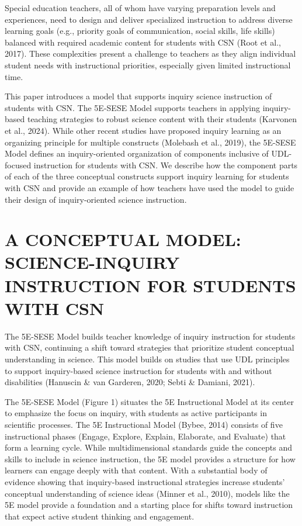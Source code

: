 \documentclass[11.5pt]{sig-alternate} %
\begin{document}
\begin{large}
Special education teachers, all of whom have varying preparation levels and experiences, need to design and deliver specialized instruction to address diverse learning goals (e.g., priority goals of communication, social skills, life skills) balanced with required academic content for students with CSN (Root et al., 2017). These complexities present a challenge to teachers as they align individual student needs with instructional priorities, especially given limited instructional time.

This paper introduces a model that supports inquiry science instruction of students with CSN. The 5E-SESE Model supports teachers in applying inquiry-based teaching strategies to robust science content with their students (Karvonen et al., 2024). While other recent studies have proposed inquiry learning as an organizing principle for multiple constructs (Molebash et al., 2019), the 5E-SESE Model defines an inquiry-oriented organization of components inclusive of UDL-focused instruction for students with CSN. We describe how the component parts of each of the three conceptual constructs support inquiry learning for students with CSN and provide an example of how teachers have used the model to guide their design of inquiry-oriented science instruction.

\section*{A CONCEPTUAL MODEL: SCIENCE-INQUIRY INSTRUCTION FOR STUDENTS WITH CSN}

The 5E-SESE Model builds teacher knowledge of inquiry instruction for students with CSN, continuing a shift toward strategies that prioritize student conceptual understanding in science. This model builds on studies that use UDL principles to support inquiry-based science instruction for students with and without disabilities (Hanuscin \& van Garderen, 2020; Sebti \& Damiani, 2021).

The 5E-SESE Model (Figure 1) situates the 5E Instructional Model at its center to emphasize the focus on inquiry, with students as active participants in scientific processes. The 5E Instructional Model (Bybee, 2014) consists of five instructional phases (Engage, Explore, Explain, Elaborate, and Evaluate) that form a learning cycle. While multidimensional standards guide the concepts and skills to include in science instruction, the 5E model provides a structure for how learners can engage deeply with that content. With a substantial body of evidence showing that inquiry-based instructional strategies increase students’ conceptual understanding of science ideas (Minner et al., 2010), models like the 5E model provide a foundation and a starting place for shifts toward instruction that expect active student thinking and engagement.


\end{large}
\end{document}
